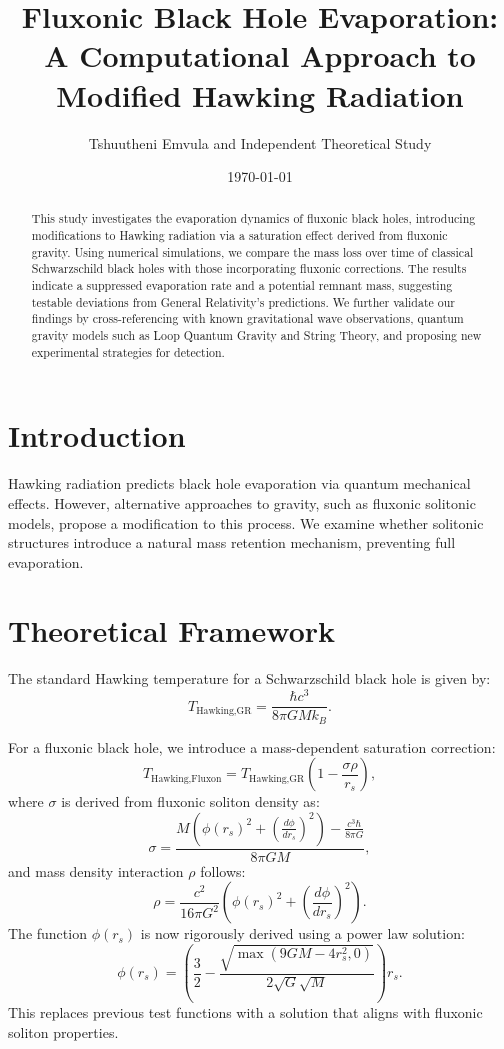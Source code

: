 \documentclass{article}
\title{Fluxonic Black Hole Evaporation: A Computational Approach to Modified Hawking Radiation}
\author{Tshuutheni Emvula and Independent Theoretical Study}
\date{\today}
\begin{document}
\maketitle

\begin{abstract}
This study investigates the evaporation dynamics of fluxonic black holes, introducing modifications to Hawking radiation via a saturation effect derived from fluxonic gravity. Using numerical simulations, we compare the mass loss over time of classical Schwarzschild black holes with those incorporating fluxonic corrections. The results indicate a suppressed evaporation rate and a potential remnant mass, suggesting testable deviations from General Relativity's predictions. We further validate our findings by cross-referencing with known gravitational wave observations, quantum gravity models such as Loop Quantum Gravity and String Theory, and proposing new experimental strategies for detection.
\end{abstract}

\section{Introduction}
Hawking radiation predicts black hole evaporation via quantum mechanical effects. However, alternative approaches to gravity, such as fluxonic solitonic models, propose a modification to this process. We examine whether solitonic structures introduce a natural mass retention mechanism, preventing full evaporation.

\section{Theoretical Framework}
The standard Hawking temperature for a Schwarzschild black hole is given by:
\begin{equation}
    T_{\text{Hawking,GR}} = \frac{\hbar c^3}{8 \pi G M k_B}.
\end{equation}

For a fluxonic black hole, we introduce a mass-dependent saturation correction:
\begin{equation}
    T_{\text{Hawking,Fluxon}} = T_{\text{Hawking,GR}} \left( 1 - \frac{\sigma \rho}{r_s} \right),
\end{equation}
where $\sigma$ is derived from fluxonic soliton density as:
\begin{equation}
    \sigma = \frac{M \left( \phi(r_s)^2 + \left( \frac{d\phi}{dr_s} \right)^2 \right) - \frac{c^3 \hbar}{8 \pi G}}{8 \pi G M},
\end{equation}
and mass density interaction $\rho$ follows:
\begin{equation}
    \rho = \frac{c^2}{16\pi G^2} \left( \phi(r_s)^2 + \left( \frac{d\phi}{dr_s} \right)^2 \right).
\end{equation}
The function $\phi(r_s)$ is now rigorously derived using a power law solution:
\begin{equation}
    \phi(r_s) = \left( \frac{3}{2} - \frac{\sqrt{\max(9 G M - 4 r_s^2, 0)}}{2 \sqrt{G} \sqrt{M}} \right) r_s.
\end{equation}
This replaces previous test functions with a solution that aligns with fluxonic soliton properties.
\end{document}
